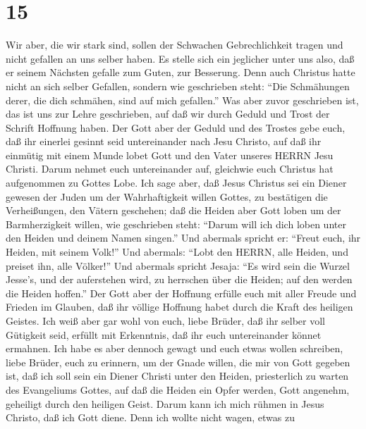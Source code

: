 \hypertarget{section-14}{%
\section{15}\label{section-14}}

 Wir aber, die wir stark sind, sollen der Schwachen
Gebrechlichkeit tragen und nicht gefallen an uns selber haben.
 Es stelle sich ein jeglicher unter uns also, daß er seinem
Nächsten gefalle zum Guten, zur Besserung.  Denn auch
Christus hatte nicht an sich selber Gefallen, sondern wie geschrieben
steht: ``Die Schmähungen derer, die dich schmähen, sind auf mich
gefallen.''  Was aber zuvor geschrieben ist, das ist uns zur
Lehre geschrieben, auf daß wir durch Geduld und Trost der Schrift
Hoffnung haben.  Der Gott aber der Geduld und des Trostes
gebe euch, daß ihr einerlei gesinnt seid untereinander nach Jesu
Christo,  auf daß ihr einmütig mit einem Munde lobet Gott
und den Vater unseres HERRN Jesu Christi.  Darum nehmet euch
untereinander auf, gleichwie euch Christus hat aufgenommen zu Gottes
Lobe.  Ich sage aber, daß Jesus Christus sei ein Diener
gewesen der Juden um der Wahrhaftigkeit willen Gottes, zu bestätigen die
Verheißungen, den Vätern geschehen;  daß die Heiden aber
Gott loben um der Barmherzigkeit willen, wie geschrieben steht: ``Darum
will ich dich loben unter den Heiden und deinem Namen singen.''
 Und abermals spricht er: ``Freut euch, ihr Heiden, mit
seinem Volk!''  Und abermals: ``Lobt den HERRN, alle
Heiden, und preiset ihn, alle Völker!''  Und abermals
spricht Jesaja: ``Es wird sein die Wurzel Jesse's, und der auferstehen
wird, zu herrschen über die Heiden; auf den werden die Heiden hoffen.''
 Der Gott aber der Hoffnung erfülle euch mit aller Freude
und Frieden im Glauben, daß ihr völlige Hoffnung habet durch die Kraft
des heiligen Geistes.  Ich weiß aber gar wohl von euch,
liebe Brüder, daß ihr selber voll Gütigkeit seid, erfüllt mit
Erkenntnis, daß ihr euch untereinander könnet ermahnen. 
Ich habe es aber dennoch gewagt und euch etwas wollen schreiben, liebe
Brüder, euch zu erinnern, um der Gnade willen, die mir von Gott gegeben
ist,  daß ich soll sein ein Diener Christi unter den
Heiden, priesterlich zu warten des Evangeliums Gottes, auf daß die
Heiden ein Opfer werden, Gott angenehm, geheiligt durch den heiligen
Geist.  Darum kann ich mich rühmen in Jesus Christo, daß
ich Gott diene.  Denn ich wollte nicht wagen, etwas zu

